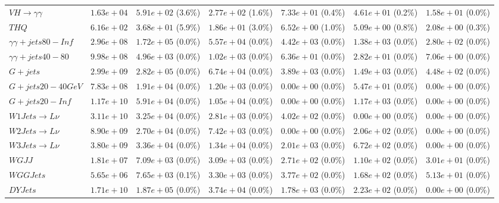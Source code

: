 \begin{landscape}
\begin{table}[h!]
\begin{tabular}{ |l|c|c|c|c|c|c| }
             $VH \rightarrow \gamma\gamma$ &  $1.63e+04$ &   $5.91e+02$ (3.6\%) &  $2.77e+02$ (1.6\%) &  $7.33e+01$ (0.4\%) &    $4.61e+01$ (0.2\%) &    $1.58e+01$ (0.0\%) \\
                                     $THQ$ &  $6.16e+02$ &   $3.68e+01$ (5.9\%) &  $1.86e+01$ (3.0\%) &  $6.52e+00$ (1.0\%) &    $5.09e+00$ (0.8\%) &    $2.08e+00$ (0.3\%) \\
              $\gamma\gamma + jets 80-Inf$ &  $2.96e+08$ &   $1.72e+05$ (0.0\%) &  $5.57e+04$ (0.0\%) &  $4.42e+03$ (0.0\%) &    $1.38e+03$ (0.0\%) &    $2.80e+02$ (0.0\%) \\
               $\gamma\gamma + jets 40-80$ &  $9.98e+08$ &   $4.96e+03$ (0.0\%) &  $1.02e+03$ (0.0\%) &  $6.36e+01$ (0.0\%) &    $2.82e+01$ (0.0\%) &    $7.06e+00$ (0.0\%) \\
                                  $G+jets$ &  $2.99e+09$ &   $2.82e+05$ (0.0\%) &  $6.74e+04$ (0.0\%) &  $3.89e+03$ (0.0\%) &    $1.49e+03$ (0.0\%) &    $4.48e+02$ (0.0\%) \\
                         $G+jets 20-40GeV$ &  $7.83e+08$ &   $1.91e+04$ (0.0\%) &  $1.20e+03$ (0.0\%) &  $0.00e+00$ (0.0\%) &    $5.47e+01$ (0.0\%) &    $0.00e+00$ (0.0\%) \\
                           $G+jets 20-Inf$ &  $1.17e+10$ &   $5.91e+04$ (0.0\%) &  $1.05e+04$ (0.0\%) &  $0.00e+00$ (0.0\%) &    $1.17e+03$ (0.0\%) &    $0.00e+00$ (0.0\%) \\
                 $W1Jets \rightarrow L\nu$ &  $3.11e+10$ &   $3.25e+04$ (0.0\%) &  $2.81e+03$ (0.0\%) &  $4.02e+02$ (0.0\%) &    $0.00e+00$ (0.0\%) &    $0.00e+00$ (0.0\%) \\
                 $W2Jets \rightarrow L\nu$ &  $8.90e+09$ &   $2.70e+04$ (0.0\%) &  $7.42e+03$ (0.0\%) &  $0.00e+00$ (0.0\%) &    $2.06e+02$ (0.0\%) &    $0.00e+00$ (0.0\%) \\
                 $W3Jets \rightarrow L\nu$ &  $3.80e+09$ &   $3.36e+04$ (0.0\%) &  $1.34e+04$ (0.0\%) &  $2.01e+03$ (0.0\%) &    $6.72e+02$ (0.0\%) &    $0.00e+00$ (0.0\%) \\
                                    $WGJJ$ &  $1.81e+07$ &   $7.09e+03$ (0.0\%) &  $3.09e+03$ (0.0\%) &  $2.71e+02$ (0.0\%) &    $1.10e+02$ (0.0\%) &    $3.01e+01$ (0.0\%) \\
                                 $WGGJets$ &  $5.65e+06$ &   $7.65e+03$ (0.1\%) &  $3.30e+03$ (0.0\%) &  $3.77e+02$ (0.0\%) &    $1.68e+02$ (0.0\%) &    $5.13e+01$ (0.0\%) \\
                                  $DYJets$ &  $1.71e+10$ &   $1.87e+05$ (0.0\%) &  $3.74e+04$ (0.0\%) &  $1.78e+03$ (0.0\%) &    $2.23e+02$ (0.0\%) &    $0.00e+00$ (0.0\%) \\

\end{tabular}
\end{table}
\end{landscape}

